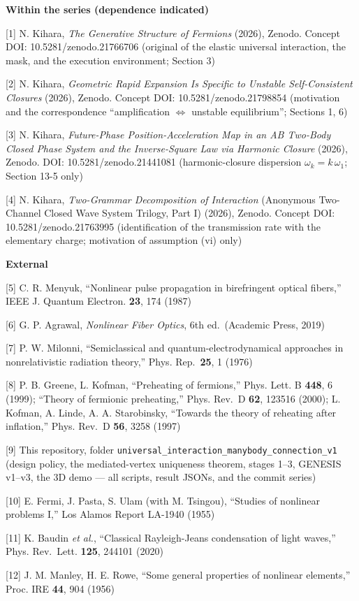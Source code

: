 \documentclass[
  a4paper,
]{article}
\begin{document}
\textbf{Within the series (dependence indicated)}

{[}1{]} N. Kihara, \emph{The Generative Structure of Fermions} (2026),
Zenodo. Concept DOI: 10.5281/zenodo.21766706 (original of the elastic
universal interaction, the mask, and the execution environment; Section
3)

{[}2{]} N. Kihara, \emph{Geometric Rapid Expansion Is Specific to
Unstable Self-Consistent Closures} (2026), Zenodo. Concept DOI:
10.5281/zenodo.21798854 (motivation and the correspondence
``amplification \(\Leftrightarrow\) unstable equilibrium''; Sections 1,
6)

{[}3{]} N. Kihara, \emph{Future-Phase Position-Acceleration Map in an AB
Two-Body Closed Phase System and the Inverse-Square Law via Harmonic
Closure} (2026), Zenodo. DOI: 10.5281/zenodo.21441081 (harmonic-closure
dispersion \(\omega_k=k\,\omega_1\); Section 13-5 only)

{[}4{]} N. Kihara, \emph{Two-Grammar Decomposition of Interaction}
(Anonymous Two-Channel Closed Wave System Trilogy, Part I) (2026),
Zenodo. Concept DOI: 10.5281/zenodo.21763995 (identification of the
transmission rate with the elementary charge; motivation of assumption
(vi) only)

\textbf{External}

{[}5{]} C. R. Menyuk, ``Nonlinear pulse propagation in birefringent
optical fibers,'' IEEE J. Quantum Electron. \textbf{23}, 174 (1987)

{[}6{]} G. P. Agrawal, \emph{Nonlinear Fiber Optics}, 6th ed.~(Academic
Press, 2019)

{[}7{]} P. W. Milonni, ``Semiclassical and quantum-electrodynamical
approaches in nonrelativistic radiation theory,'' Phys.
Rep.~\textbf{25}, 1 (1976)

{[}8{]} P. B. Greene, L. Kofman, ``Preheating of fermions,'' Phys. Lett.
B \textbf{448}, 6 (1999); ``Theory of fermionic preheating,'' Phys.
Rev.~D \textbf{62}, 123516 (2000); L. Kofman, A. Linde, A. A.
Starobinsky, ``Towards the theory of reheating after inflation,'' Phys.
Rev.~D \textbf{56}, 3258 (1997)

{[}9{]} This repository, folder
\texttt{universal\_interaction\_manybody\_connection\_v1} (design
policy, the mediated-vertex uniqueness theorem, stages 1--3, GENESIS
v1--v3, the 3D demo --- all scripts, result JSONs, and the commit
series)

{[}10{]} E. Fermi, J. Pasta, S. Ulam (with M. Tsingou), ``Studies of
nonlinear problems I,'' Los Alamos Report LA-1940 (1955)

{[}11{]} K. Baudin \emph{et al.}, ``Classical Rayleigh-Jeans
condensation of light waves,'' Phys. Rev.~Lett. \textbf{125}, 244101
(2020)

{[}12{]} J. M. Manley, H. E. Rowe, ``Some general properties of
nonlinear elements,'' Proc. IRE \textbf{44}, 904 (1956)
\end{document}
